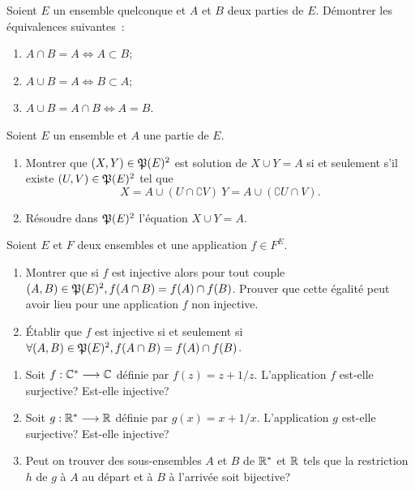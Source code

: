 \begin{exercice}
    Soient \(E\) un ensemble quelconque et \(A\) et \(B\) deux parties de \(E\). 
    Démontrer les équivalences suivantes~:
    \begin{enumerate}
        \item \(A \cap B = A \iff A \subset B \);
        \item \(A \cup B = A \iff B \subset A \);
        \item \(A \cup B = A \cap B \iff A = B \).
    \end{enumerate}
\end{exercice}

\begin{exercice}[Résolution dans \(\Part(E)\) des équations \(X \cup Y=A\) et 
    \(X \cap Y=A\)]
    Soient \(E\) un ensemble et \(A\) une partie de \(E\).
    \begin{enumerate}
        \item Montrer que \((X,Y)\in\mathfrak{P}(E)^2\) est solution de \(X \cup Y=A\) 
            si et seulement s'il existe \((U, V) \in \mathfrak{P}(E)^2\) tel que 
            \[X=A\cup(U\cap \complement V) \ Y=A\cup(\complement U \cap V).\]
        \item Résoudre dans \(\mathfrak{P}(E)^2\) l'équation \(X \cup Y = A\).
    \end{enumerate}
\end{exercice}

\begin{exercice}
    Soient \(E\) et \(F\) deux ensembles et une application \(f \in F^E\).
    \begin{enumerate}
        \item Montrer que si \(f\) est injective alors pour tout couple \((A,B) 
            \in \mathfrak{P}(E)^2, f(A\cap B) = f(A) \cap f(B)\). Prouver que cette 
            égalité peut avoir lieu pour une application \(f\) non injective.
        \item Établir que \(f\) est injective si et seulement si \(\forall (A,B) 
            \in \mathfrak{P}(E)^2, f(A\cap B) = f(A) \cap f(B)\).
    \end{enumerate}
\end{exercice}

\begin{exercice}
    \begin{enumerate}
        \item Soit \(f : \mathbb{C}^* \longrightarrow \mathbb{C}\) définie par \(f(z)=z+1/z\). 
            L'application \(f\) est-elle surjective? Est-elle injective?
        \item Soit \(g : \mathbb{R}^* \longrightarrow \mathbb{R}\) définie par \(g(x)=x+1/x\). 
            L'application \(g\) est-elle surjective? Est-elle injective?
        \item Peut on trouver des sous-ensembles \(A\) et \(B\) de \(\mathbb{R}^*\) et 
            \(\mathbb{R}\) tels que la restriction \(h\) de \(g\) à \(A\) au départ et à 
            \(B\) à l'arrivée soit bijective?
    \end{enumerate}
\end{exercice}

